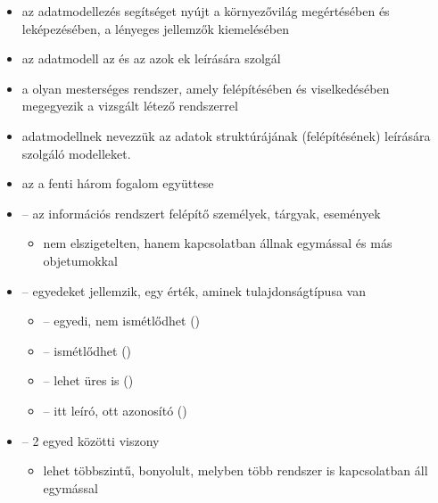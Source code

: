 \documentclass[main.tex]{subfiles}
\begin{document}
  \begin{itemize}
    \item az adatmodellezés segítséget nyújt a
    környezővilág megértésében és leképezésében,
    a lényeges jellemzők kiemelésében

    \item az adatmodell az  és az
    azok ek leírására szolgál

    \item a  olyan mesterséges rendszer,
    amely felépítésében és viselkedésében megegyezik
    a vizsgált létező rendszerrel

    \item adatmodellnek nevezzük az adatok struktúrájának
    (felépítésének) leírására szolgáló modelleket.
  \end{itemize}

  \begin{itemize}
    \item az  a fenti három fogalom együttese
    
    \item {} – az információs rendszert
    felépítő személyek, tárgyak, események 
    \begin{itemize}
      \item nem elszigetelten, hanem kapcsolatban állnak
      egymással és más objetumokkal
    \end{itemize}
    
    \item {} – egyedeket jellemzik,
    egy érték, aminek tulajdonságtípusa van
    \begin{itemize}
      \item {}
      \tabto{6.5cm} – \tabto{7.5cm}
      egyedi, nem ismétlődhet ()
      
      \item {}
      \tabto{6.5cm} – \tabto{7.5cm}
      ismétlődhet ()

      \item {}
      \tabto{6.5cm} – \tabto{7.5cm}
      lehet üres is ()

      \item {}
      \tabto{6.5cm} – \tabto{7.5cm}
      itt leíró, ott azonosító ()
    \end{itemize}

    \item {} – 2 egyed közötti viszony
    \begin{itemize}
      \item lehet többszintű, bonyolult, melyben
      több rendszer is kapcsolatban áll egymással
    \end{itemize}
  \end{itemize}
\end{document}
